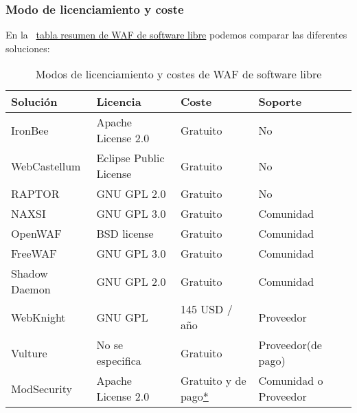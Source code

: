 \subsubsection{Modo de licenciamiento y coste}
En la {~\hyperref[tab:waflibre]{tabla resumen de WAF de software libre}} podemos comparar las diferentes soluciones:

\begin{table}[h!]
  \centering
  \label{tab:waflibre}
  \begin{tabular}{llll}
    \hline
     Solución             & Licencia                        & Coste                           & Soporte                         \\
    \hline
     IronBee              & Apache License 2.0              & Gratuito                        & No                              \\
     WebCastellum					& Eclipse Public License          & Gratuito                        & No                              \\
     RAPTOR					      & GNU GPL 2.0                     & Gratuito                        & No                              \\
     NAXSI					      & GNU GPL 3.0                     & Gratuito                        & Comunidad                       \\
     OpenWAF					    & BSD license                     & Gratuito                        & Comunidad                       \\
     FreeWAF					    & GNU GPL 3.0                     & Gratuito                        & Comunidad                       \\
     Shadow Daemon				& GNU GPL 2.0                     & Gratuito                        & Comunidad                       \\
     WebKnight		        & GNU GPL                         & 145 USD / año                   & Proveedor                       \\
     Vulture					    & No se especifica                & Gratuito                        & Proveedor(de pago)              \\
     ModSecurity 					& Apache License 2.0              & Gratuito y de pago\hyperlink{modlic}{*}  & Comunidad o Proveedor  \\
    \hline
  \end{tabular}
  \caption{Modos de licenciamiento y costes de WAF de software libre}
\end{table}

